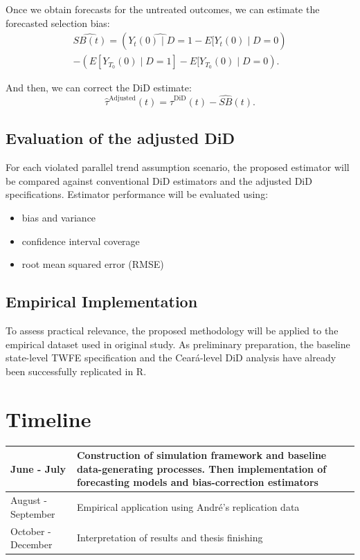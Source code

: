 \documentclass[12pt]{article}
\begin{document}
Once we obtain forecasts for the untreated outcomes, we can estimate the forecasted selection bias:
\begin{equation}
\begin{split}
    \widehat{SB(t)} = \left( \widehat{Y_t(0) \mid D = 1} - E[Y_{t}(0) \mid D = 0 \right) \\ - \left( E [Y_{T_0}(0) \mid D = 1] - E[Y_{T_0}(0) \mid D = 0 \right).
    \label{eq:placeholder_label}
\end{split}
\end{equation}

 And then, we can correct the DiD estimate:
\begin{equation}
    \widehat{\tau}^{\text{Adjusted}}(t) = \widehat{\tau}^{\text{DiD}}(t) - \widehat{SB}(t).
    \label{eq:placeholder_label}
\end{equation}

\subsection{Evaluation of the adjusted DiD}

For each violated parallel trend assumption scenario, the proposed estimator will be compared against conventional DiD estimators and the adjusted DiD specifications. Estimator performance will be evaluated using:
\begin{itemize}
    \item bias and variance
    \item confidence interval coverage
    \item root mean squared error (RMSE) 
\end{itemize}

\subsection{Empirical Implementation}

To assess practical relevance, the proposed methodology will be applied to the empirical dataset used in \cite{mancha_when_2025} original study. As preliminary preparation, the baseline state-level TWFE specification and the Ceará-level DiD analysis have already been successfully replicated in R.

\section{Timeline}
\begin{table}[H]
    \centering
    \begin{tabular}{p{3cm} p{9cm}}
    \toprule
    June - July & Construction of simulation framework and baseline data-generating processes. Then implementation of forecasting models and bias-correction estimators \\
    \midrule
    August - September & Empirical application using André’s replication data \\
    \midrule
    October - December & Interpretation of results and thesis finishing \\
    \bottomrule
    \end{tabular}
\end{table}



\end{document}

